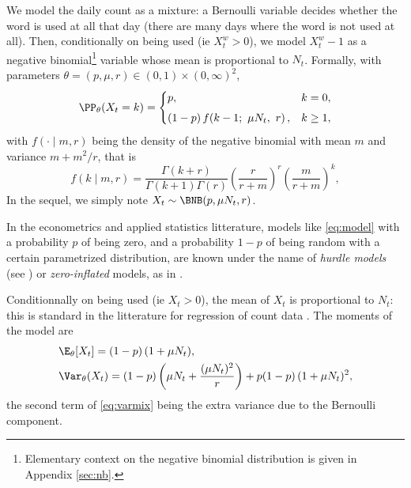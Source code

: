 \documentclass[11pt,a4paper]{article}
\begin{document}
We model the daily count as a mixture: a Bernoulli variable
decides whether the word is used at all that day (there are many days where the word is not used at all). Then, conditionally on being
used (ie $X_t^w > 0$), we model $X_t^w - 1$ as a negative binomial\footnote{Elementary context on the negative binomial distribution is given in Appendix \ref{sec:nb}.} variable whose mean is
proportional to $N_t$. Formally, with parameters
$\theta = (p, \mu, r) \in (0,1) \times (0,\infty)^{2}$,
\begin{equation}
  \PP_\theta(X_t = k) = 
  \begin{cases}
    p, & k = 0,\\[0.4em]
    (1 - p)\, f\!\left(k - 1;\ \mu N_t,\ r\right), & k \geq 1,
  \end{cases}
  \label{eq:model}
\end{equation}
with $f(\cdot \mid m,r)$ being the density of the negative binomial with mean $m$ and variance $m + m^2 / r$, that is
\begin{equation}\label{eq:nbpdf}
  f(k \mid m, r) = \frac{\Gamma(k + r)}{\Gamma(k + 1) \Gamma(r)} \left(\frac{r}{r + m}\right)^r \left(\frac{m}{r + m}\right)^k,
\end{equation}
In the sequel, we simply note $X_t \sim \BNB(p, \mu N_t, r)$. 

In the econometrics and applied statistics litterature, models like \eqref{eq:model} with a probability $p$ of being zero, and a probability $1-p$ of being random with a certain parametrized distribution, are known under the name of \emph{hurdle models} (see \cite{cragg1971some, mullahy1986specification}) or \emph{zero-inflated} models, as in \citep{lambert1992zero}. 

Conditionnally on being used (ie $X_t > 0$), the mean of $X_t$ is proportional to $N_t$: this is standard in the litterature for regression of count data \citep{cameron2013regression,hilbe2011negative}. The moments of the model are
\begin{align}
  &\E_\theta[X_t] = (1 - p)\,(1 + \mu N_t), \\
  &\Var_\theta(X_t) = (1 - p)\left(\mu N_t + \frac{(\mu N_t)^{2}}{r}\right)
   + p (1 - p)\,(1 + \mu N_t)^{2},
  \label{eq:varmix}
\end{align}
the second term of \eqref{eq:varmix} being the extra variance due to the Bernoulli component. 



 
\end{document}
